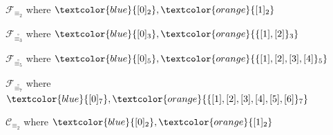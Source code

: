 \documentclass[10pt,serif, professionalfont]{beamer}
\begin{document}
\begin{frame}{$\mathcal{F}_{\equiv_{2}}$ where 
    $\textcolor{blue}{[0]_{2}},\textcolor{orange}{[1]_{2}}$}

    
\end{frame}

\begin{frame}{$\mathcal{F}_{\stackrel{\circ}{\equiv_{3}}}$ where 
    $\textcolor{blue}{[0]_{3}},\textcolor{orange}{\lbrace [1],[2] \rbrace_{3}}$}

    
\end{frame}
\begin{frame}{$\mathcal{F}_{\stackrel{\circ}{\equiv_{5}}}$ where 
    $\textcolor{blue}{[0]_{5}},\textcolor{orange}{\lbrace [1],[2],[3],[4] \rbrace_{5}}$}

    
\end{frame}
\begin{frame}{$\mathcal{F}_{\stackrel{\circ}{\equiv_{7}}}$ where 
    $\textcolor{blue}{[0]_{7}},\textcolor{orange}{\lbrace [1],[2],[3],[4],[5],[6] \rbrace_{7}}$}

    
\end{frame}


\begin{frame}{$\mathcal{C}_{\equiv_{2}}$ where 
    $\textcolor{blue}{[0]_{2}},\textcolor{orange}{[1]_{2}}$}

    
\end{frame}
\end{document}
